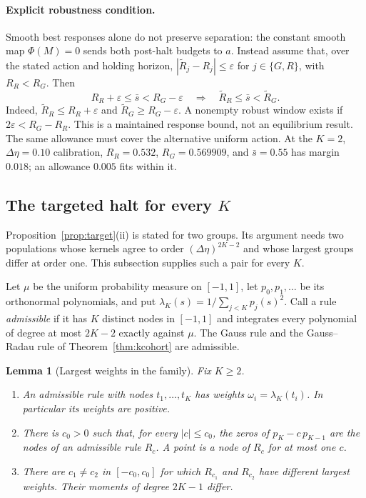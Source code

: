 \documentclass[12pt]{article}
\newtheorem{lemma}[theorem]{Lemma}
\theoremstyle{definition}
\theoremstyle{remark}
\begin{document}
\paragraph{Explicit robustness condition.} Smooth best responses alone do not preserve separation: the constant smooth map $\Phi(M)=0$ sends both post-halt budgets to $a$. Instead assume that, over the stated action and holding horizon, $|\widetilde R_j-R_j|\le\varepsilon$ for $j\in\{G,R\}$, with $R_R<R_G$. Then
\begin{equation}\label{eq:reopt_gap}
 R_R+\varepsilon\le\bar s<R_G-\varepsilon
 \quad\Longrightarrow\quad \widetilde R_R\le\bar s<\widetilde R_G.
\end{equation}
Indeed, $\widetilde R_R\le R_R+\varepsilon$ and $\widetilde R_G\ge R_G-\varepsilon$. A nonempty robust window exists if $2\varepsilon<R_G-R_R$. This is a maintained response bound, not an equilibrium result. The same allowance must cover the alternative uniform action. At the $K=2$, $\Delta\eta=0.10$ calibration, $R_R=0.532$, $R_G=0.569909$, and $\bar s=0.55$ has margin $0.018$; an allowance $0.005$ fits within it.

\subsection{The targeted halt for every \texorpdfstring{$K$}{K}}\label{app:everyK}

Proposition~\ref{prop:target}(ii) is stated for two groups. Its argument needs two populations whose kernels agree to order $(\Delta\eta)^{2K-2}$ and whose largest groups differ at order one. This subsection supplies such a pair for every $K$.

Let $\mu$ be the uniform probability measure on $[-1,1]$, let $p_0,p_1,\ldots$ be its orthonormal polynomials, and put $\lambda_K(s)=1/\sum_{j<K}p_j(s)^2$. Call a rule \emph{admissible} if it has $K$ distinct nodes in $[-1,1]$ and integrates every polynomial of degree at most $2K-2$ exactly against $\mu$. The Gauss rule and the Gauss--Radau rule of Theorem~\ref{thm:kcohort} are admissible.

\begin{lemma}[Largest weights in the family]\label{lem:everyK}
Fix $K\ge2$.
\begin{enumerate}[label=(\roman*),itemsep=1pt]
\item An admissible rule with nodes $t_1,\ldots,t_K$ has weights $\omega_i=\lambda_K(t_i)$. In particular its weights are positive.
\item There is $c_0>0$ such that, for every $|c|\le c_0$, the zeros of $p_K-c\,p_{K-1}$ are the nodes of an admissible rule $R_c$. A point is a node of $R_c$ for at most one $c$.
\item There are $c_1\ne c_2$ in $[-c_0,c_0]$ for which $R_{c_1}$ and $R_{c_2}$ have different largest weights. Their moments of degree $2K-1$ differ.
\end{enumerate}
\end{lemma}
\end{document}
